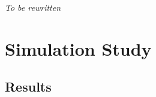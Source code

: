 \documentclass[11pt]{article}
\newtheorem{corollary}[theorem]{Corollary}
\begin{document}



\textit{\textcolor{BrickRed}{To be rewritten}}


\section{Simulation Study}
\label{sec:simulation-study}

\subsection{Results}
\label{subsec:sim1-results}
\end{document}
